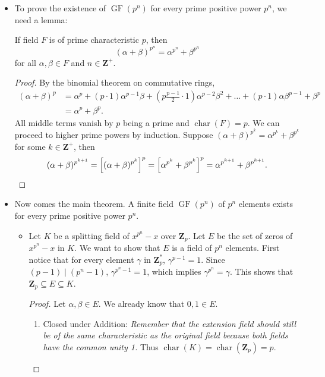 \documentclass[11pt]{article}
\newcommand{\Z}{\mathbf{Z}}
\newcommand{\kar}{\operatorname{char}}
\newcommand{\GF}{\operatorname{GF}} %
\begin{document}
\begin{itemize}
\begin{proof}
        Since $x^{p^n}-x = x (x^{p^n-1} - 1)$, every nonzero root to $x^{p^n}-x$ is a root to $x^{p^n-1} - 1$. Say $\alpha \in K^*$ is a root to $x^{p^n-1} - 1$. Then by long division \[\frac{x^{p^n-1} - 1}{x-\alpha} = x^{p^n - 2}+\alpha x^{p^n - 3} + \alpha^2 x^{p^n - 4}+ \dots + \alpha^{p^n - 3}x + \alpha^{p^n - 2}.\] Call this polynomial $g(x)$, then \[g(\alpha) = (p^n-1)\alpha^{p^n - 2} = (p^n-1)\frac{1}{\alpha} = -\frac{1}{\alpha} \neq 0\] (by $\alpha^{p^n-1} - 1 = 0$ and $\kar(F)=p$). This shows that every zero $\alpha$ has multiplicity 1.
    \end{proof}
    \item To prove the existence of $\GF(p^n)$ for every prime positive power $p^n$, we need a lemma:
    
    If field $F$ is of prime characteristic $p$, then \[(\alpha + \beta)^{p^n} = \alpha^{p^n} + \beta^{p^n}\] for all $\alpha,\beta \in F$ and $n \in \Z^+$.
    \begin{proof}
        By the binomial theorem on commutative rings,
        \begin{align*}
            (\alpha + \beta)^p & = \alpha^p + (p \cdot 1) \alpha^{p-1}\beta + (p\frac{p-1}{2} \cdot 1)\alpha^{p-2}\beta^2 + \dots + (p \cdot 1) \alpha\beta^{p-1} + \beta^p \\ & = \alpha^p + \beta^p.
        \end{align*}
        All middle terms vanish by $p$ being a prime and $\kar(F) = p$. We can proceed to higher prime powers by induction. Suppose $(\alpha + \beta)^{p^k} = \alpha^{p^k} + \beta^{p^k}$ for some $k \in \Z^+$, then \[(\alpha + \beta)^{p^{k+1}} = \Big[(\alpha + \beta)^{p^k}\Big]^p = \Big[\alpha^{p^k} + \beta^{p^k}\Big]^p = \alpha^{p^{k+1}} + \beta^{p^{k+1}}.\qedhere\]
    \end{proof}
    \item Now comes the main theorem. A finite field $\GF(p^n)$ of $p^n$ elements exists for every prime positive power $p^n$. 
    \begin{itemize}
        \item Let $K$ be a splitting field of $x^{p^n} - x$ over $\Z_p$. Let $E$ be the set of zeros of $x^{p^n} - x$ in $K$. We want to show that $E$ is a field of $p^n$ elements. First notice that for every element $\gamma$ in $\Z_p^*$, $\gamma^{p-1} = 1$. Since $(p-1) \mid (p^n - 1)$, $\gamma^{p^n-1} = 1$, which implies $\gamma^{p^n} = \gamma$. This shows that $\Z_p \subseteq E \subseteq K$.
        \begin{proof}
            Let $\alpha,\beta \in E$. We already know that $0,1 \in E$.
        \begin{enumerate}[label=(\roman*)]
            \item Closed under Addition: \emph{Remember that the extension field should still be of the same characteristic as the original field because both fields have the common unity 1.} Thus $\kar(K) = \kar(\Z_p) = p$.
            

\end{enumerate}
\end{proof}
\end{itemize}
\end{itemize}
\end{document}
